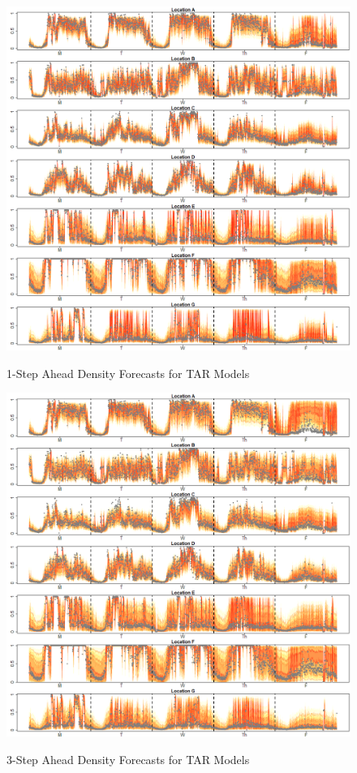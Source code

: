 \begin{figure}[ht!]
\caption{1-Step Ahead Density Forecasts for TAR Models}
\includegraphics[width=\textwidth]{DENS1Plots}
\label{fig:DENS1Plots}
\end{figure}


\begin{figure}[ht!]
\caption{3-Step Ahead Density Forecasts for TAR Models}
\includegraphics[width=\textwidth]{DENS3Plots}
\label{fig:DENS3Plots}
\end{figure}

